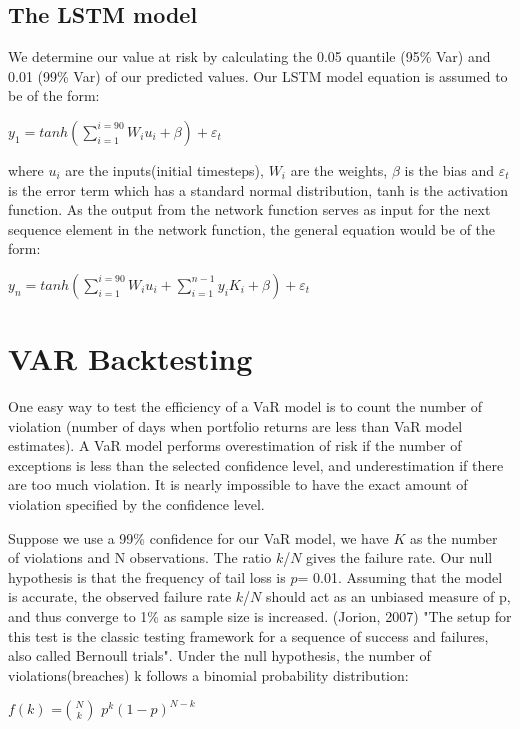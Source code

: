 \documentclass[a4paper,11pt,oneside]{book}
\begin{document}
\subsection{The LSTM model}
We determine our value at risk by calculating the 0.05 quantile (95\% Var) and 0.01 (99\% Var) of our predicted values. Our LSTM model equation is assumed to be of the form:
\begin{center}
	$y_1= tanh(\sum_{i=1}^{i=90}W_{i}u_{i}+\beta)+\varepsilon_t$
\end{center} 

where $u_{i}$ are the inputs(initial timesteps), $W_i$ are the weights, $\beta$ is the bias and $\varepsilon_t$ is the error term which has a standard normal distribution, tanh is the activation function. As the output from the network function serves as input for the next sequence element in the network function, the general equation would be of the form:

\begin{center}
	$y_n= tanh(\sum_{i=1}^{i=90}W_{i}u_{i}+\sum_{i=1}^{n-1}y_{i}K_{i}+\beta)+\varepsilon_t$
\end{center} 


\section{VAR Backtesting}
One easy way to test the efficiency of a VaR model is to count the number of violation (number of days when portfolio returns are less than VaR model estimates). A VaR model performs overestimation of risk if the number of exceptions is less than the selected confidence level, and underestimation if there are too much violation. It is nearly impossible to have the exact amount of violation specified by the confidence level.\newline\newline

Suppose we use a 99\% confidence for our VaR model, we have $K$ as the number of violations and N observations. The ratio $k$/$N$ gives the failure rate. Our null hypothesis is that the frequency of tail loss is $p$= 0.01. Assuming that the model is accurate, the observed failure rate $k$/$N$
should act as an unbiased measure of p, and thus converge to 1\% as sample size is
increased. (Jorion, 2007) \newline\newline
"The setup for this test is the classic testing framework for a sequence of success and failures, also called Bernoull trials". Under the null hypothesis, the number of violations(breaches) k follows a binomial probability distribution:
\begin{center}
	$f(k)$ =$N \choose {k}$ $p^{k}(1-p)^{N-k}$ 
\end{center}
\end{document}
